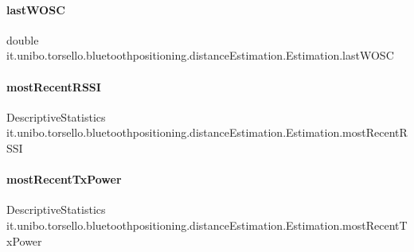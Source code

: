 \paragraph{\texorpdfstring{last\+W\+O\+SC}{lastWOSC}}
{\footnotesize\ttfamily double it.\+unibo.\+torsello.\+bluetoothpositioning.\+distance\+Estimation.\+Estimation.\+last\+W\+O\+SC\hspace{0.3cm}{\ttfamily [private]}}

\hypertarget{classit_1_1unibo_1_1torsello_1_1bluetoothpositioning_1_1distanceEstimation_1_1Estimation_a1e9aa70e3f42e2721dc80d9ff512c835_a1e9aa70e3f42e2721dc80d9ff512c835}{}\label{classit_1_1unibo_1_1torsello_1_1bluetoothpositioning_1_1distanceEstimation_1_1Estimation_a1e9aa70e3f42e2721dc80d9ff512c835_a1e9aa70e3f42e2721dc80d9ff512c835} 
\paragraph{\texorpdfstring{most\+Recent\+R\+S\+SI}{mostRecentRSSI}}
{\footnotesize\ttfamily Descriptive\+Statistics it.\+unibo.\+torsello.\+bluetoothpositioning.\+distance\+Estimation.\+Estimation.\+most\+Recent\+R\+S\+SI\hspace{0.3cm}{\ttfamily [private]}}

\hypertarget{classit_1_1unibo_1_1torsello_1_1bluetoothpositioning_1_1distanceEstimation_1_1Estimation_a20ade9b8868875760a4cfba2474a1e3a_a20ade9b8868875760a4cfba2474a1e3a}{}\label{classit_1_1unibo_1_1torsello_1_1bluetoothpositioning_1_1distanceEstimation_1_1Estimation_a20ade9b8868875760a4cfba2474a1e3a_a20ade9b8868875760a4cfba2474a1e3a} 
\paragraph{\texorpdfstring{most\+Recent\+Tx\+Power}{mostRecentTxPower}}
{\footnotesize\ttfamily Descriptive\+Statistics it.\+unibo.\+torsello.\+bluetoothpositioning.\+distance\+Estimation.\+Estimation.\+most\+Recent\+Tx\+Power\hspace{0.3cm}{\ttfamily [private]}}

